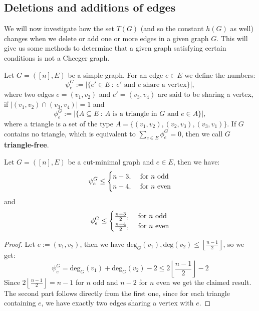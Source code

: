 \subsection{Deletions and additions of edges}
We will now investigate how the set \(T(G)\) (and so the constant \(h(G)\) as well) changes when we delete or add one or more edges in a given graph \(G\). This will give us some methods to determine that a given graph satisfying certain conditions is not a Cheeger graph.
\begin{defi}
Let \(G=([n],E)\) be a simple graph. For an edge \(e\in E\) we define the numbers:
\[
\psi_e^G:=|\{e'\in E\: :\: e'\text{ and }e\text{ share a vertex}\}|,
\]
where two edges \(e=(v_1,v_2)\) and \(e'=(v_3,v_4)\) are said to be sharing a vertex, if \(|(v_1,v_2)\cap (v_3,v_4)|=1\) and
\[
\phi_e^G:=|\{A\subseteq E\: :\: A\text{ is a triangle in }G\text{ and }e\in A\}|,
\]
where a triangle is a set of the type \(A=\{(v_1,v_2),(v_2,v_3),(v_3,v_1)\}\). If \(G\) contains no triangle, which is equivalent to \(\sum\limits_{e\in E}\phi_e^G=0\), then we call \(G\) \textbf{triangle-free}.
\end{defi}
\begin{lem}\label{lemma2}
Let \(G=([n],E)\) be a cut-minimal graph and \(e\in E\), then we have:
\begin{equation}
\psi_e^G\leq
\begin{cases}
n-3,&\text{ for }n\text{ odd}\notag\\
n-4,&\text{ for }n\text{ even}\notag
\end{cases}
\end{equation}
and
\begin{equation}
\phi_e^G\leq
\begin{cases}
\frac{n-3}{2},&\text{ for }n\text{ odd}\notag\\
\frac{n-4}{2},&\text{ for }n\text{ even}\notag
\end{cases}
\end{equation}
\begin{proof}
Let \(e:=(v_1,v_2)\), then we have \(\text{deg}_G(v_1),\text{deg}(v_2)\leq\left\lfloor\frac{n-1}{2}\right\rfloor\), so we get:
\[
\psi_e^G=\text{deg}_G(v_1)+\text{deg}_G(v_2)-2\leq2\left\lfloor\frac{n-1}{2}\right\rfloor-2
\]
Since \(2\left\lfloor\frac{n-1}{2}\right\rfloor=n-1\) for \(n\) odd and \(n-2\) for \(n\) even we get the claimed result.\\
The second part follows directly from the first one, since for each triangle containing \(e\), we have exactly two edges sharing a vertex with \(e\).
\end{proof}
\end{lem}
